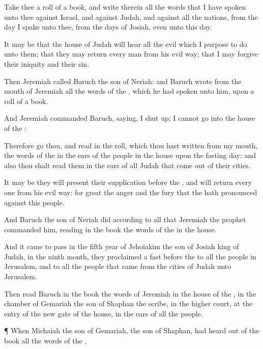 {Take thee a
roll of a
book, and
write therein all the
words that I have
spoken unto thee against
Israel, and against
Judah, and against all the
nations, from the
day I
spake unto thee, from the
days of
Josiah, even unto this
day.

It may be that the
house of
Judah will
hear all the
evil which I
purpose to
do unto them; that they may
return every
man from his
evil
way; that I may
forgive their
iniquity and their
sin.

Then
Jeremiah
called
Baruch the
son of
Neriah: and
Baruch
wrote from the
mouth of
Jeremiah all the
words of the
{}, which he had
spoken unto him, upon a
roll of a
book.

And
Jeremiah
commanded
Baruch,
saying, I
{} shut
up; I
cannot
go into the
house of the
{}:

Therefore
go thou, and
read in the
roll, which thou hast
written from my
mouth, the
words of the
{} in the
ears of the
people in the
{}
house upon the
fasting
day: and also thou shalt
read them in the
ears of all
Judah that come
out of their
cities.

It may be they will
present their
supplication
before the
{}, and will
return every
one from his
evil
way: for
great
{} the
anger and the
fury that the
{} hath
pronounced against this
people.

And
Baruch the
son of
Neriah
did according to all that
Jeremiah the
prophet
commanded him,
reading in the
book the
words of the
{} in the
{}
house.


\par }{\PP {}And it came to pass in the
fifth
year of
Jehoiakim the
son of
Josiah
king of
Judah, in the
ninth
month,
{} they
proclaimed a
fast
before the
{} to all the
people in
Jerusalem, and to all the
people that
came from the
cities of
Judah unto
Jerusalem.

Then
read
Baruch in the
book the
words of
Jeremiah in the
house of the
{}, in the
chamber of
Gemariah the
son of
Shaphan the
scribe, in the
higher
court, at the
entry of the
new
gate of the
{}
house, in the
ears of all the
people.


\par }{\PP {}¶ When
Michaiah the
son of
Gemariah, the
son of
Shaphan, had
heard out of the
book all the
words of the
{},

}
